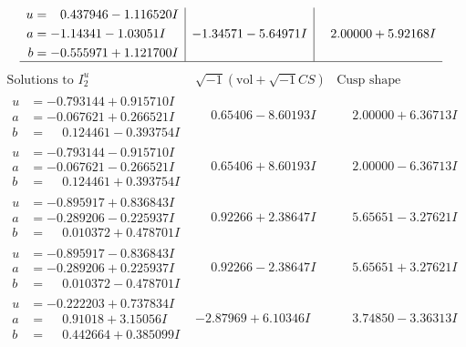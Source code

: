\documentclass[1p]{elsarticle_modified}
\theoremstyle{definition}
\newcommand{\I}{\sqrt{-1}}
\begin{document}
$$\begin{array}{c|c|c}
\begin{aligned}
u &= \phantom{-}0.437946 - 1.116520 I \\
a &= -1.14341 - 1.03051 I \\
b &= -0.555971 + 1.121700 I\end{aligned}
 & -1.34571 - 5.64971 I & \phantom{-}2.00000 + 5.92168 I\\
 \hline 
 \end{array}$$\newpage$$\begin{array}{c|c|c}  
\text{Solutions to }I^u_{2}& \I (\text{vol} + \sqrt{-1}CS) & \text{Cusp shape}\\
 \hline 
\begin{aligned}
u &= -0.793144 + 0.915710 I \\
a &= -0.067621 + 0.266521 I \\
b &= \phantom{-}0.124461 - 0.393754 I\end{aligned}
 & \phantom{-}0.65406 - 8.60193 I & \phantom{-}2.00000 + 6.36713 I \\ \hline\begin{aligned}
u &= -0.793144 - 0.915710 I \\
a &= -0.067621 - 0.266521 I \\
b &= \phantom{-}0.124461 + 0.393754 I\end{aligned}
 & \phantom{-}0.65406 + 8.60193 I & \phantom{-}2.00000 - 6.36713 I \\ \hline\begin{aligned}
u &= -0.895917 + 0.836843 I \\
a &= -0.289206 - 0.225937 I \\
b &= \phantom{-}0.010372 + 0.478701 I\end{aligned}
 & \phantom{-}0.92266 + 2.38647 I & \phantom{-}5.65651 - 3.27621 I \\ \hline\begin{aligned}
u &= -0.895917 - 0.836843 I \\
a &= -0.289206 + 0.225937 I \\
b &= \phantom{-}0.010372 - 0.478701 I\end{aligned}
 & \phantom{-}0.92266 - 2.38647 I & \phantom{-}5.65651 + 3.27621 I \\ \hline\begin{aligned}
u &= -0.222203 + 0.737834 I \\
a &= \phantom{-}0.91018 + 3.15056 I \\
b &= \phantom{-}0.442664 + 0.385099 I\end{aligned}
 & -2.87969 + 6.10346 I & \phantom{-}3.74850 - 3.36313 I \\ \hline\begin{aligned}

\end{aligned}
\end{array}$$
\end{document}
